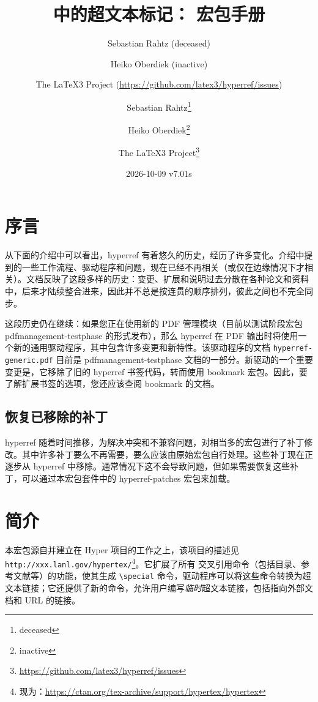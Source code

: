 \documentclass{article}
\author{Sebastian Rahtz (deceased)\and
       Heiko Oberdiek (inactive)\and
       The \LaTeX3 Project (\url{https://github.com/latex3/hyperref/issues})}
\author{Sebastian Rahtz\thanks{deceased}\and
       Heiko Oberdiek\thanks{inactive}\and
       The \LaTeX3 Project\thanks{\url{https://github.com/latex3/hyperref/issues}}}
\title{\hologo{LaTeX} 中的超文本标记：\xpackage{hyperref} 宏包手册}
\date{2026-10-09 v7.01s}
\newcommand*{\cs}[1]{%
  \texttt{\textbackslash #1}%
}
\newcommand*{\xpackage}[1]{\textsf{#1}}
\begin{document}
\thispagestyle{empty}
\maketitle
\tableofcontents
\setcounter{tocdepth}{2}%

\section{序言}

从下面的介绍中可以看出，\xpackage{hyperref} 有着悠久的历史，经历了许多变化。介绍中提到的一些工作流程、驱动程序和问题，现在已经不再相关（或仅在边缘情况下才相关）。文档反映了这段多样的历史：变更、扩展和说明过去分散在各种论文和资料中，后来才陆续整合进来，因此并不总是按连贯的顺序排列，彼此之间也不完全同步。

这段历史仍在继续：如果您正在使用新的  PDF 管理模块（目前以测试阶段宏包 \xpackage{pdfmanagement-testphase} 的形式发布），那么 \xpackage{hyperref} 在 PDF 输出时将使用一个新的通用驱动程序，其中包含许多变更和新特性。该驱动程序的文档 \texttt{hyperref-generic.pdf} 目前是 \xpackage{pdfmanagement-testphase} 文档的一部分。新驱动的一个重要变更是，它移除了旧的 \xpackage{hyperref} 书签代码，转而使用 \xpackage{bookmark} 宏包。因此，要了解扩展书签的选项，您还应该查阅 \xpackage{bookmark} 的文档。

\subsection{恢复已移除的补丁}

\xpackage{hyperref} 随着时间推移，为解决冲突和不兼容问题，对相当多的宏包进行了补丁修改。其中许多补丁要么不再需要，要么应该由原始宏包自行处理。这些补丁现在正逐步从 \xpackage{hyperref} 中移除。通常情况下这不会导致问题，但如果需要恢复这些补丁，可以通过本宏包套件中的 \xpackage{hyperref-patches} 宏包来加载。



\section{简介}

本宏包源自并建立在 Hyper 项目的工作之上，该项目的描述见 \nolinkurl{http://xxx.lanl.gov/hypertex/}\footnote{现为：\url{https://ctan.org/tex-archive/support/hypertex/hypertex}}。它扩展了所有  交叉引用命令（包括目录、参考文献等）的功能，使其生成 \cs{special} 命令，驱动程序可以将这些命令转换为超文本链接；它还提供了新的命令，允许用户编写\emph{临时}超文本链接，包括指向外部文档和 URL 的链接。
\end{document}
